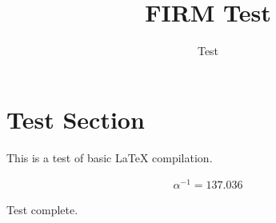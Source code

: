 \documentclass[12pt]{article}
\title{FIRM Test}
\author{Test}
\begin{document}
\maketitle

\section{Test Section}

This is a test of basic LaTeX compilation.

\begin{align}
\alpha^{-1} = 137.036
\end{align}

Test complete.
\end{document}
